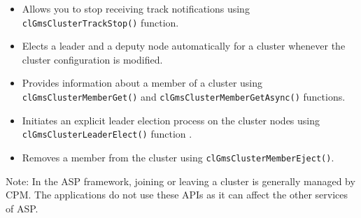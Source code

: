 \begin{flushleft}
\begin{enumerate}
\begin{itemize}
the cluster across nodes and notifies if any changes are made using
{\tt{clGmsClusterTrack()}} function .
\item Allows you to stop receiving track notifications using {\tt{clGmsClusterTrackStop()}} function.
\item Elects a leader and a deputy node automatically for a
cluster whenever the cluster configuration is modified.
\item Provides information about a member of a cluster using
{\tt{clGmsClusterMemberGet()}} and {\tt{clGmsClusterMemberGetAsync()}} functions.
\item Initiates an explicit leader election process on the cluster
nodes using {\tt{clGmsClusterLeaderElect()}} function .
\item Removes a member from the cluster using {\tt{clGmsClusterMemberEject()}}.
\end{itemize}
\begin{Desc}
\item[Note:]In the ASP framework, joining or leaving a cluster is generally
managed by CPM. The applications do not use these APIs as it can
affect the other services of ASP.\end{Desc}


\end{enumerate}
\end{flushleft}
